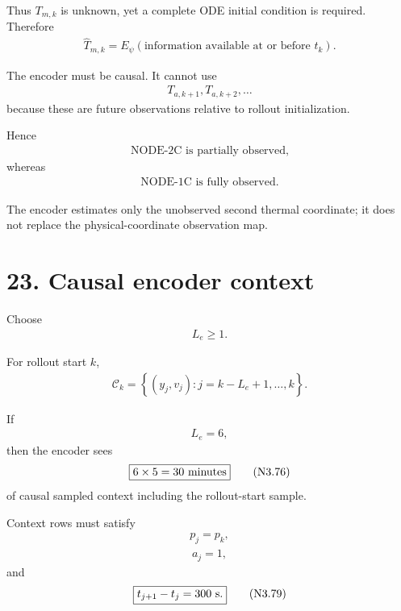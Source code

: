 \documentclass[11pt]{article}
\begin{document}
Thus \(T_{m,k}\) is unknown, yet a complete ODE initial condition is required. Therefore
\begin{align}
\boxed{
\widehat T_{m,k}
=
E_\psi(\text{information available at or before }t_k).
}
\tag{N3.72}
\end{align}

The encoder must be causal. It cannot use
\begin{align}
T_{a,k+1},T_{a,k+2},\ldots
\end{align}
because these are future observations relative to rollout initialization.

Hence
\begin{align}
\boxed{\text{NODE-2C is partially observed},}
\tag{N3.73}
\end{align}
whereas
\begin{align}
\boxed{\text{NODE-1C is fully observed}.}
\tag{N3.74}
\end{align}

The encoder estimates only the unobserved second thermal coordinate; it does not replace the physical-coordinate observation map.

\section*{23. Causal encoder context}

Choose
\begin{align}
L_e\ge1.
\end{align}

For rollout start \(k\),
\begin{align}
\boxed{
\mathcal C_k
=
\left\{
(y_j,v_j):
j=k-L_e+1,\ldots,k
\right\}.
}
\tag{N3.75}
\end{align}

If
\begin{align}
L_e=6,
\end{align}
then the encoder sees
\begin{align}
\boxed{6\times5=30\ {\rm minutes}}
\tag{N3.76}
\end{align}
of causal sampled context including the rollout-start sample.

Context rows must satisfy
\begin{align}
\boxed{p_j=p_k,}
\tag{N3.77}
\end{align}
\begin{align}
\boxed{a_j=1,}
\tag{N3.78}
\end{align}
and
\begin{align}
\boxed{t_{j+1}-t_j=300\ {\rm s}.}
\tag{N3.79}
\end{align}
\end{document}
